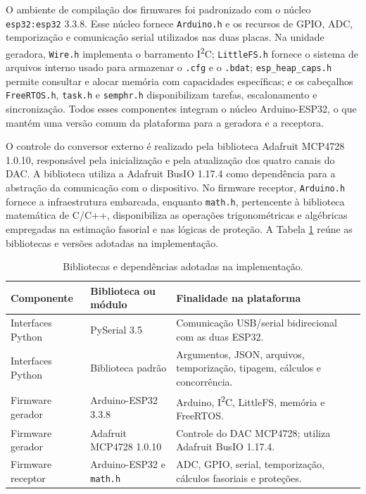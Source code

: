O ambiente de compilação dos firmwares foi padronizado com o núcleo \texttt{esp32:esp32} 3.3.8. Esse núcleo fornece \texttt{Arduino.h} e os recursos de GPIO, ADC, temporização e comunicação serial utilizados nas duas placas. Na unidade geradora, \texttt{Wire.h} implementa o barramento I\textsuperscript{2}C; \texttt{LittleFS.h} fornece o sistema de arquivos interno usado para armazenar o \texttt{.cfg} e o \texttt{.bdat}; \texttt{esp\_heap\_caps.h} permite consultar e alocar memória com capacidades específicas; e os cabeçalhos \texttt{FreeRTOS.h}, \texttt{task.h} e \texttt{semphr.h} disponibilizam tarefas, escalonamento e sincronização. Todos esses componentes integram o núcleo Arduino-ESP32, o que mantém uma versão comum da plataforma para a geradora e a receptora.

O controle do conversor externo é realizado pela biblioteca Adafruit MCP4728 1.0.10, responsável pela inicialização e pela atualização dos quatro canais do DAC. A biblioteca utiliza a Adafruit BusIO 1.17.4 como dependência para a abstração da comunicação com o dispositivo. No firmware receptor, \texttt{Arduino.h} fornece a infraestrutura embarcada, enquanto \texttt{math.h}, pertencente à biblioteca matemática de C/C++, disponibiliza as operações trigonométricas e algébricas empregadas na estimação fasorial e nas lógicas de proteção. A Tabela \ref{tab:bibliotecas-software} reúne as bibliotecas e versões adotadas na implementação.

\begin{table}[H]
  \centering
  \small
  \caption{Bibliotecas e dependências adotadas na implementação.}
  \label{tab:bibliotecas-software}
  \begin{tabular}{p{3.1cm}p{3.5cm}p{6.0cm}}
    \toprule
    Componente & Biblioteca ou módulo & Finalidade na plataforma \\
    \midrule
    Interfaces Python & PySerial 3.5 & Comunicação USB/serial bidirecional com as duas ESP32. \\
    Interfaces Python & Biblioteca padrão & Argumentos, JSON, arquivos, temporização, tipagem, cálculos e concorrência. \\
    Firmware gerador & Arduino-ESP32 3.3.8 & Arduino, I\textsuperscript{2}C, LittleFS, memória e FreeRTOS. \\
    Firmware gerador & Adafruit MCP4728 1.0.10 & Controle do DAC MCP4728; utiliza Adafruit BusIO 1.17.4. \\
    Firmware receptor & Arduino-ESP32 e \texttt{math.h} & ADC, GPIO, serial, temporização, cálculos fasoriais e proteções. \\
    \bottomrule
  \end{tabular}
\end{table}

